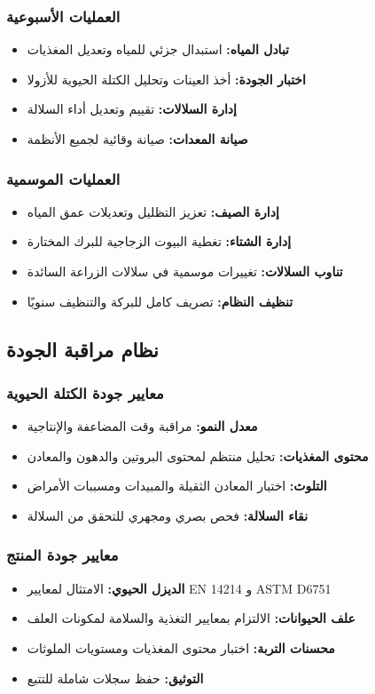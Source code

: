 \subsubsection{العمليات الأسبوعية}
\begin{itemize}
    \item \textbf{تبادل المياه:} استبدال جزئي للمياه وتعديل المغذيات
    \item \textbf{اختبار الجودة:} أخذ العينات وتحليل الكتلة الحيوية للأزولا
    \item \textbf{إدارة السلالات:} تقييم وتعديل أداء السلالة
    \item \textbf{صيانة المعدات:} صيانة وقائية لجميع الأنظمة
\end{itemize}

\subsubsection{العمليات الموسمية}
\begin{itemize}
    \item \textbf{إدارة الصيف:} تعزيز التظليل وتعديلات عمق المياه
    \item \textbf{إدارة الشتاء:} تغطية البيوت الزجاجية للبرك المختارة
    \item \textbf{تناوب السلالات:} تغييرات موسمية في سلالات الزراعة السائدة
    \item \textbf{تنظيف النظام:} تصريف كامل للبركة والتنظيف سنويًا
\end{itemize}

\subsection{نظام مراقبة الجودة}

\subsubsection{معايير جودة الكتلة الحيوية}
\begin{itemize}
    \item \textbf{معدل النمو:} مراقبة وقت المضاعفة والإنتاجية
    \item \textbf{محتوى المغذيات:} تحليل منتظم لمحتوى البروتين والدهون والمعادن
    \item \textbf{التلوث:} اختبار المعادن الثقيلة والمبيدات ومسببات الأمراض
    \item \textbf{نقاء السلالة:} فحص بصري ومجهري للتحقق من السلالة
\end{itemize}

\subsubsection{معايير جودة المنتج}
\begin{itemize}
    \item \textbf{الديزل الحيوي:} الامتثال لمعايير EN 14214 و ASTM D6751
    \item \textbf{علف الحيوانات:} الالتزام بمعايير التغذية والسلامة لمكونات العلف
    \item \textbf{محسنات التربة:} اختبار محتوى المغذيات ومستويات الملوثات
    \item \textbf{التوثيق:} حفظ سجلات شاملة للتتبع
\end{itemize}


